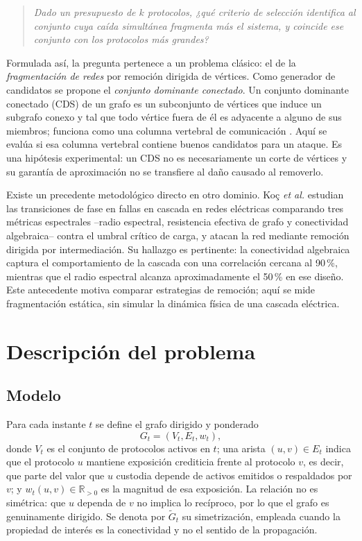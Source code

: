 \documentclass[journal]{IEEEtran}
\begin{document}
\begin{quote}
\emph{Dado un presupuesto de $k$ protocolos, ¿qué criterio de selección
identifica al conjunto cuya caída simultánea fragmenta más el sistema, y
coincide ese conjunto con los protocolos más grandes?}
\end{quote}

Formulada así, la pregunta pertenece a un problema clásico: el de la
\emph{fragmentación de redes} por remoción dirigida de vértices. Como generador
de candidatos se propone el \emph{conjunto dominante conectado}. Un conjunto dominante conectado (CDS) de un grafo es un subconjunto
de vértices que induce un subgrafo conexo y tal que todo vértice fuera de él es
adyacente a alguno de sus miembros; funciona como una columna vertebral de
comunicación \cite{guha1998approximation}. Aquí se evalúa si esa columna vertebral
contiene buenos candidatos para un ataque. Es una hipótesis experimental: un CDS
no es necesariamente un corte de vértices y su garantía de aproximación no se
transfiere al daño causado al removerlo.

Existe un precedente metodológico directo en otro dominio. Koç \emph{et al.}
\cite{koc2014topological} estudian las transiciones de fase en fallas en cascada
en redes eléctricas comparando tres métricas espectrales --radio espectral,
resistencia efectiva de grafo y conectividad algebraica-- contra el umbral crítico
de carga, y atacan la red mediante remoción dirigida por intermediación. Su
hallazgo es pertinente: la conectividad algebraica \cite{fiedler1973algebraic}
captura el comportamiento de la cascada con una correlación cercana al 90\,\%,
mientras que el radio espectral alcanza aproximadamente el 50\,\% en ese diseño.
Este antecedente motiva comparar estrategias de remoción; aquí se mide
fragmentación estática, sin simular la dinámica física de una cascada eléctrica.

\section{Descripción del problema}

\subsection{Modelo}

Para cada instante $t$ se define el grafo dirigido y ponderado
\begin{equation}
G_t = (V_t, E_t, w_t),
\label{eq:modelo}
\end{equation}
donde $V_t$ es el conjunto de protocolos activos en $t$; una arista
$(u,v) \in E_t$ indica que el protocolo $u$ mantiene exposición crediticia frente
al protocolo $v$, es decir, que parte del valor que $u$ custodia depende de
activos emitidos o respaldados por $v$; y $w_t(u,v) \in \mathbb{R}_{>0}$ es la
magnitud de esa exposición. La relación no es simétrica: que $u$ dependa de $v$ no
implica lo recíproco, por lo que el grafo es genuinamente dirigido. Se denota por
$\tilde{G}_t$ su simetrización, empleada cuando la propiedad de interés es la
conectividad y no el sentido de la propagación.
\end{document}
